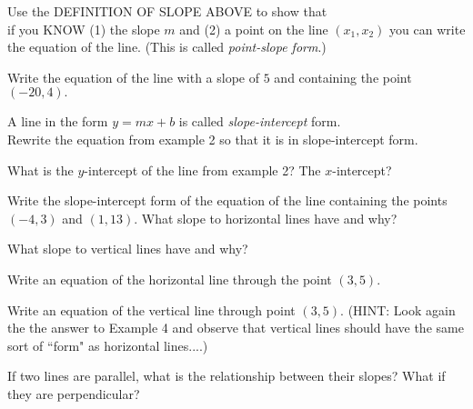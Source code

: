 \documentclass[11pt]{article}
\begin{document}
\newpage

{} Use the DEFINITION OF SLOPE ABOVE to show that\\

if you KNOW (1) the slope $m$ and (2) a point on the line $(x_1,x_2)$ you can write the equation of the line. (This is called {\it{ point-slope form}}.)

\vspace{1in}

{} Write the equation of the line with a slope of $5$ and containing the point $(-20,4).$

\vspace{1in}


{}  A line in the form $y=mx+b$ is called {\it{slope-intercept}} form.\\

{}  Rewrite the  equation from example 2 so that it is in slope-intercept form.

\vspace{1in}

{} What is the $y$-intercept of the line from example 2? The $x$-intercept?
\vspace{1in}

{}

\newpage

{} Write the slope-intercept form of the equation of the line containing the points $(-4,3)$ and $(1,13).$
\vfill
{} What slope to horizontal lines have and why?

\vspace{1in}

{} What slope to vertical lines have and why?

{} Write an equation of the horizontal line through the point $(3,5).$
\vspace{1in}

{} Write an equation of the vertical line through point $(3,5).$ (HINT: Look again the the answer to Example 4 and observe that vertical lines should have the same sort of ``form" as horizontal lines....)
\vspace{1in}

{} If two lines are parallel, what is the relationship between their slopes? What if they are perpendicular?

\vspace{1in}
\end{document}
